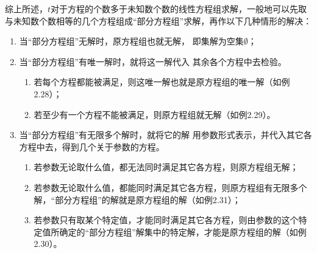 综上所述，$t$对于方程的个数多于未知数个数的线性方程组求解，一般地可以先取与未知数个数相等的几个方程组成“部分方程组”求解，再作以下几种情形的解决：
\begin{enumerate}
    \item 当“部分方程组”无解时，原方程组也就无解，
即集解为空集$\emptyset$；
\item 当“部分方程组”有唯一解时，就将这一解代入
其余各个方程中去检验。 
\begin{enumerate}
    \item 若每个方程都能被满足，则这唯一解也就是原方程组的唯一解（如例2.28）；
    \item 若至少有一个方程不能被满足，则原方程组就无解（如例2.29）。
\end{enumerate}

\item 当“部分方程组”有无限多个解时，就将它的解
用参数形式表示，并代入其它各方程中去，得到几个关于参数的方程。
\begin{enumerate}
    \item 若参数无论取什么值，都无法同时满足其它各方程，则原方程组无解；
    \item 若参数无论取什么值，都能同时满足其它各方程，则原方程组有无限多个解，“部分方程组”的解就是原方程组的解（如例2.31）；
    \item 若参数只有取某个特定值，才能同时满足其它各方程，则由参数的这个特定值所确定的“部分方程组”解集中的特定解，才能是原方程组的解（如例2.30）。
\end{enumerate}

\end{enumerate}

